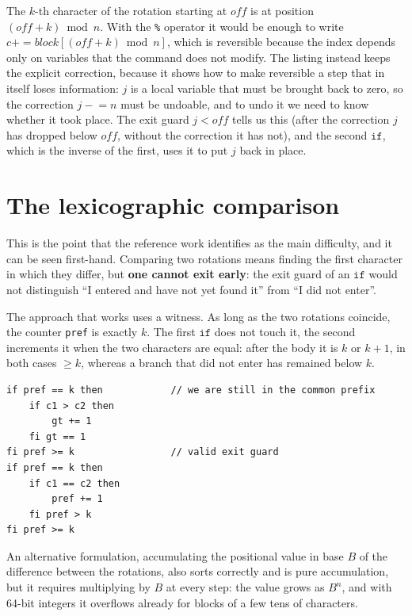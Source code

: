 \noindent
The $k$-th character of the rotation starting at $\mathit{off}$ is at
position $(\mathit{off}+k) \bmod n$. With the \texttt{\%} operator it would be
enough to write
$c \mathbin{+\!\!=} \mathit{block}[(\mathit{off}+k) \bmod n]$, which is
reversible because the index depends only on variables that the command does not
modify. The listing instead keeps the explicit correction, because it shows how
to make reversible a step that in itself loses information: $j$ is a
local variable that must be brought back to zero, so the correction
$j \mathrel{-}= n$ must be undoable, and to undo it we need to know whether it
took place. The exit guard $j < \mathit{off}$ tells us this (after the correction
$j$ has dropped below $\mathit{off}$, without the correction it has not), and the second
$\mathtt{if}$, which is the inverse of the first, uses it to put $j$ back in place.

\section{The lexicographic comparison}

This is the point that the reference work identifies as the main difficulty, and
it can be seen first-hand. Comparing two rotations means finding the first
character in which they differ, but \textbf{one cannot exit early}: the
exit guard of an $\mathtt{if}$ would not distinguish ``I entered and have not
yet found it'' from ``I did not enter''.

The approach that works uses a witness. As long as the two rotations coincide, the
counter \texttt{pref} is exactly $k$. The first $\mathtt{if}$ does not
touch it, the second increments it when the two characters are equal: after the
body it is $k$ or $k+1$, in both cases $\geq k$, whereas a branch that did not
enter has remained below $k$.

\begin{lstlisting}
if pref == k then            // we are still in the common prefix
    if c1 > c2 then
        gt += 1
    fi gt == 1
fi pref >= k                 // valid exit guard
if pref == k then
    if c1 == c2 then
        pref += 1
    fi pref > k
fi pref >= k
\end{lstlisting}

\noindent
An alternative formulation, accumulating the positional value in base $B$ of the
difference between the rotations, also sorts correctly and is pure
accumulation, but it requires multiplying by $B$ at every step: the value
grows as $B^n$, and with 64-bit integers it overflows already for blocks of a few
tens of characters.

